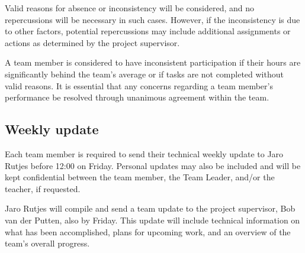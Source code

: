 \documentclass{projdoc}
\begin{document}
Valid reasons for absence or inconsistency will be considered, and no 
repercussions will be necessary in such cases. However, if the inconsistency 
is due to other factors, potential repercussions may include additional 
assignments or actions as determined by the project supervisor.

A team member is considered to have inconsistent participation if their hours 
are significantly behind the team’s average or if tasks are not completed 
without valid reasons. It is essential that any concerns regarding a team 
member's performance be resolved through unanimous agreement within the team.


\subsection{Weekly update}
Each team member is required to send their technical weekly update to Jaro 
Rutjes before 12:00 on Friday. Personal updates may also be included and will be kept 
confidential between the team member, the Team Leader, and/or the teacher, 
if requested.

Jaro Rutjes will compile and send a team update to the project supervisor,
Bob van der Putten, also by Friday. This update will include technical 
information on what has been accomplished, plans for upcoming work, and an 
overview of the team's overall progress.
\newpage
\end{document}
